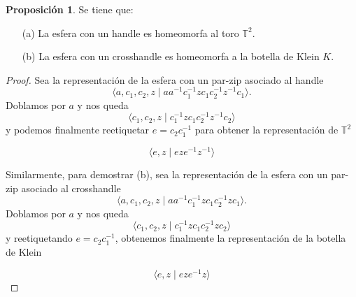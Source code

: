 \documentclass[10pt]{report}
\newcommand{\Toro}{\mathbb{T}^2}
\theoremstyle{definition}
\newtheorem{prop}[defin]{Proposición}
\begin{document}
\begin{prop}\label{prop:handletoro_crosshandleklein}
Se tiene que:

\begin{itemize}

\item[(a)] La esfera con un handle es homeomorfa al toro $\Toro$.
\item [(b)] La esfera con un crosshandle es homeomorfa a la botella de Klein $K$.

\end{itemize}
\end{prop}
\begin{proof}
Sea la representación de la esfera con un par-zip asociado al handle $$\langle a,c_1,c_2,z\mid aa^{-1} c_1^{-1}zc_1c_2^{-1}z^{-1}c_1\rangle.$$ Doblamos por $a$ y nos queda
\[
\langle c_1,c_2,z\mid c_1^{-1}zc_1c_2^{-1}z^{-1}c_2\rangle
\]
y podemos finalmente reetiquetar $e=c_2c_1^{-1}$ para obtener la representación de $\Toro$ 

\[
\langle e,z\mid eze^{-1}z^{-1}\rangle
\]

Similarmente, para demostrar (b), sea la representación de la esfera con un par-zip asociado al crosshandle $$\langle a,c_1,c_2,z\mid aa^{-1} c_1^{-1}zc_1c_2^{-1}zc_1\rangle.$$ Doblamos por $a$ y nos queda
\[
\langle c_1,c_2,z\mid c_1^{-1}zc_1c_2^{-1}zc_2\rangle
\]
y reetiquetando $e=c_2c_1^{-1}$, obtenemos finalmente la representación de la botella de Klein

\[
\langle e,z\mid eze^{-1}z\rangle
\]


\end{proof}
\end{document}
